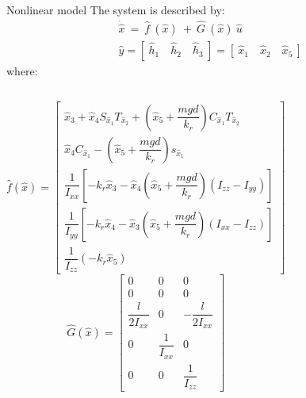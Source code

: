 \begin{frame}{Nonlinear model}
	The system is described by:
	\begin{align}
		&{\dot{\hat{x}} \ =  \ \hat{f} \ (\hat{x}) \ + \ \hat{G} \ (\hat{x}) \ \hat{u}} \\
		&{\hat{y}}  =  [ \ \hat{h}_1 \quad \hat{h}_2 \quad \hat{h}_3 \ ] = [ \ \hat{x}_1 \quad \hat{x}_2 \quad \hat{x}_5 \ ]
	\end{align}
	where:
	\begin{columns}
	\begin{equation*}
	\hat{f}(\hat{x})=
	\begin{bmatrix}
	\hat{x}_3 + \hat{x}_4 S_{\hat{x}_1} T_{\hat{x}_2} + (\hat{x}_5 + \dfrac{mgd}{k_r}) C_{\hat{x}_1} T_{\hat{x}_2} \\
	\hat{x}_4 C_{\hat{x}_1} - (\hat{x}_5 + \dfrac{mgd}{k_r}) s_{\hat{x}_1}  \\
	\dfrac{1}{I_{xx}} [-k_r \hat{x}_3 - \hat{x}_4(\hat{x}_5 + \dfrac{mgd}{k_r}) (I_{zz} - I_{yy}) ] \\
	\dfrac{1}{I_{yy}} [-k_r \hat{x}_4 - \hat{x}_3(\hat{x}_5 + \dfrac{mgd}{k_r}) (I_{xx} - I_{zz})] \\
	\dfrac{1}{I_{zz}} (-k_r \hat{x}_5)
	\end{bmatrix}
	\end{equation*}
	\renewcommand{\arraystretch}{1}
	\begin{equation*}
	{\hat{G}(\hat{x})} =
	\begin{bmatrix}
	0 & 0 & 0 \\
	0 & 0 & 0 \\
	\dfrac{l}{2I_{xx}} & 0 & -\dfrac{l}{2I_{xx}} \\
	0 & \dfrac{1}{I_{xx}} & 0 \\
	0 & 0 & \dfrac{1}{I_{zz}}	
	\end{bmatrix}
	\end{equation*}
		\end{columns}
\end{frame}

